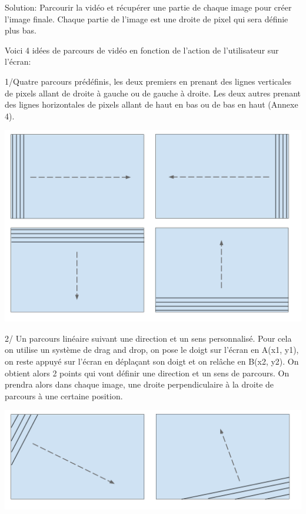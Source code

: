 \documentclass[a4paper,12pt]{report}
\begin{document}
\noindent Solution: Parcourir la vidéo et récupérer une partie de chaque image pour créer l'image finale.
Chaque partie de l'image est une droite de pixel qui sera définie plus bas.\bigskip

\noindent Voici 4 idées de parcours de vidéo en fonction de l’action de l’utilisateur sur l’écran:\par\bigskip

1/Quatre parcours prédéfinis, les deux premiers en prenant des lignes verticales de pixels allant de droite à gauche ou de gauche à droite.
Les deux autres prenant des lignes horizontales de pixels allant de haut en bas ou de bas en haut (Annexe 4).
\begin{center}
 \includegraphics[scale=0.2]{./obturateur1.png}
\end{center}\newpage

2/ Un parcours linéaire suivant une direction et un sens personnalisé.
Pour cela on utilise un système de drag and drop, on pose le doigt sur l’écran en A(x1, y1), on reste appuyé sur l’écran en déplaçant son doigt et on relâche en B(x2, y2).
On obtient alors 2 points qui vont définir une direction et un sens de parcours.
On prendra alors dans chaque image, une droite perpendiculaire à la droite de parcours à une certaine position.
\begin{center}
 \includegraphics[scale=0.2]{./obturateur2.png}
\end{center}\par\bigskip
\end{document}
